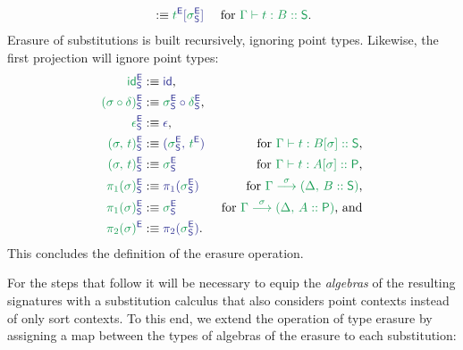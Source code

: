 \begin{defn}
\begin{align*}
  &:\equiv \tqm{\grm{t}^\EE[\grm{\sigma}^\EE_\Sc]}
  & \text{ for \grm{\Gamma \vdash t : B :: \Sc}.}
\end{align*}
Erasure of substitutions is built recursively, ignoring point types.
Likewise, the first projection will ignore point types:
\begin{align*}\label{eq:red-e-sub}
\tqm{\grm{\id}^\EE_\Sc}
  &:\equiv \tqm{\id} \text{,}
  & \\
\tqm{\grm{(\sigma \circ \delta)}^\EE_\Sc}
  &:\equiv \tqm{\grm{\sigma}^\EE_\Sc \circ \grm{\delta}^\EE_\Sc} \text{,}
  & \\
\tqm{\grm{\epsilon}^\EE_\Sc}
  &:\equiv \tqm{\epsilon} \text{,}
  & \\
\tqm{\grm{(\sigma,\, t)}^\EE_\Sc}
  &:\equiv \tqm{(\grm{\sigma}^\EE_\Sc,\, \grm{t}^\EE)}
  & \text{ for \grm{\Gamma \vdash t : B[\sigma] :: \Sc},} \\
\tqm{\grm{(\sigma,\, t)}^\EE_\Sc}
  &:\equiv \tqm{\grm{\sigma}^\EE_\Sc}
  & \text{ for \grm{\Gamma \vdash t : A[\sigma] :: \Pc},} \\
\tqm{\grm{\pi_1(\sigma)}^\EE_\Sc}
  &:\equiv \tqm{\pi_1(\grm{\sigma}^\EE_\Sc)}
  & \text{ for \grm{\IISub{\sigma}{\Gamma}{(\Delta,\, B :: \Sc)}},} \\
\tqm{\grm{\pi_1(\sigma)}^\EE_\Sc}
  &:\equiv \tqm{\grm{\sigma}^\EE_\Sc}
  & \text{ for \grm{\IISub{\sigma}{\Gamma}{(\Delta,\, A :: \Pc)}}, and} \\
\tqm{\grm{\pi_2(\sigma)}^\EE}
  &:\equiv \tqm{\pi_2(\grm{\sigma}^\EE_\Sc)} \text{.}
  &
\end{align*} %
This concludes the definition of the erasure operation.
\end{defn} %

For the steps that follow it will be necessary to equip the \emph{algebras}
of the resulting signatures with a substitution calculus that also considers
point contexts instead of only sort contexts.
To this end, we extend the operation of type erasure by assigning a map between
the types of algebras of the erasure to each substitution:

